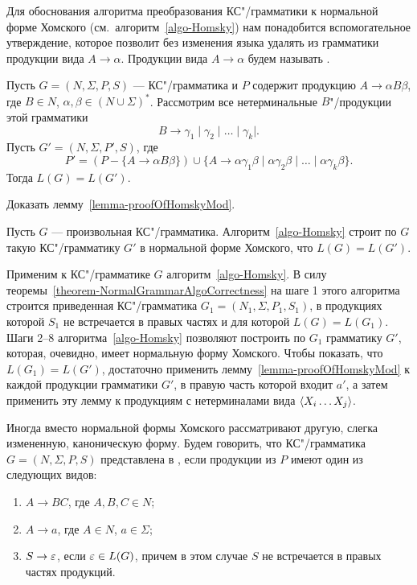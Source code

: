 Для обоснования алгоритма преобразования КС"/грамматики к нормальной форме Хом\-ско\-го (см.~алгоритм~\ref{algo-Homsky}) нам понадобится вспомогательное утверждение, которое позволит без изменения языка удалять из грамматики продукции вида $A\to\alpha$. Продукции вида $A\to\alpha$ будем называть .

\begin{mylemma}
\label{lemma-proofOfHomskyMod}
Пусть $G=(N,\Sigma,P,S)$ --- КС"/грамматика и $P$ содержит продукцию $A\to\alpha B\beta$, где $B\in N$, $\alpha,\beta\in(N\cup\Sigma)^*$. Рассмотрим все нетерминальные $B$"/про\-дук\-ции этой грамматики
\[
    B \to \gamma_1 \mid \gamma_2 \mid \ldots \mid \gamma_k |.
\]
Пусть $G'=(N,\Sigma,P',S)$, где
\[
    P' = (P - \{A\to\alpha B\beta\}) \cup
        \{A \to \alpha\gamma_1\beta
            \mid \alpha\gamma_2\beta
            \mid \ldots
            \mid \alpha\gamma_k\beta\}.
\]
Тогда $L(G)=L(G')$.
\end{mylemma}

\begin{myproblem}
Доказать лемму~\ref{lemma-proofOfHomskyMod}.
\end{myproblem}

\begin{mytheorem}
\label{theorem-AlgoHomskyProof}
Пусть $G$ --- произвольная КС"/грамматика. Алгоритм~\ref{algo-Homsky} строит по $G$ такую КС"/грамматику $G'$ в нормальной форме Хомского, что $L(G)=L(G')$.
\end{mytheorem}

\begin{myproof}
Применим к КС"/грамматике $G$ алгоритм~\ref{algo-Homsky}. В силу теоремы~\ref{theorem-NormalGrammarAlgoCorrectness} на шаге 1 этого алгоритма строится приведенная КС"/грамматика $G_1=(N_1,\Sigma, P_1, S_1)$, в продукциях которой $S_1$ не встречается в правых частях и для которой $L(G)=L(G_1)$. Шаги 2--8 алгоритма~\ref{algo-Homsky} позволяют построить по $G_1$ грамматику $G'$, которая, очевидно, имеет нормальную форму Хомского. Чтобы показать, что $L(G_1)=L(G')$, достаточно применить лемму~\ref{lemma-proofOfHomskyMod} к каждой продукции грамматики $G'$, в правую часть которой входит $a'$, а затем применить эту лемму к продукциям с нетерминалами вида $\langle X_i\ldots X_j \rangle$.
\end{myproof}

Иногда вместо нормальной формы Хомского рассматривают другую, слегка
измененную, каноническую форму. Будем говорить, что КС"/грамматика
$G=(N,\Sigma,P,S)$ представлена в , если продукции из $P$ имеют один из следующих видов:
\begin{enumerate}
    \item $A\to BC$, где $A,B,C\in N$;
    \item $A\to a$, где $A\in N$, $a\in\Sigma$;
    \item $S\to\varepsilon$, если $\varepsilon\in L(G)$, причем в этом случае
    $S$ не встречается в правых частях продукций.
\end{enumerate}

